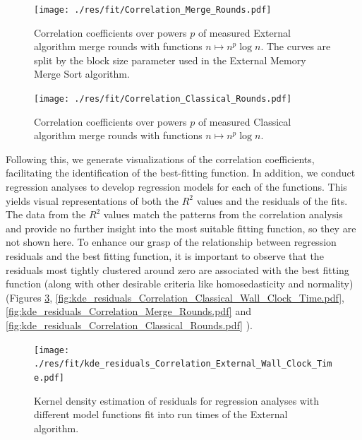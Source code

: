 \documentclass[twocolumn]{article}
\begin{document}
\begin{figure}[htb]
    \begin{minipage}{0.475 \textwidth}
        \centering
        \texttt{[image: ./res/fit/Correlation\_Merge\_Rounds.pdf]}
        \caption{Correlation coefficients over powers \( p \) of measured External algorithm merge rounds with functions \( n \mapsto n^p \log n\). The curves are split by the block size parameter used in the External Memory Merge Sort algorithm.}
        \label{fig:Correlation_Merge_Rounds.pdf}
    \end{minipage}
\end{figure}

\begin{figure}[htb]
    \begin{minipage}{0.475 \textwidth}
        \centering
        \texttt{[image: ./res/fit/Correlation\_Classical\_Rounds.pdf]}
        \caption{Correlation coefficients over powers \( p \) of measured Classical algorithm merge rounds with functions \( n \mapsto n^p \log n\).}
        \label{fig:Correlation_Classical_Rounds.pdf}
    \end{minipage}
\end{figure}

Following this, we generate visualizations of the correlation coefficients, facilitating the identification of the best-fitting function.
In addition, we conduct regression analyses to develop regression models for each of the functions.
This yields visual representations of both the \( R^2 \) values and the residuals of the fits. The data from the \( R^2 \) values match the patterns from the correlation analysis and provide no further insight into the most suitable fitting function, so they are not shown here.
To enhance our grasp of the relationship between regression residuals and the best fitting function, it is important to observe that the residuals most tightly clustered around zero are associated with the best fitting function (along with other desirable criteria like homosedasticity and normality)
(Figures \ref{fig:kde_residuals_Correlation_External_Wall_Clock_Time.pdf},
\ref{fig:kde_residuals_Correlation_Classical_Wall_Clock_Time.pdf},
\ref{fig:kde_residuals_Correlation_Merge_Rounds.pdf} and
\ref{fig:kde_residuals_Correlation_Classical_Rounds.pdf}
).

\begin{figure}[htb]
    \begin{minipage}{0.475 \textwidth}
        \centering
        \texttt{[image: ./res/fit/kde\_residuals\_Correlation\_External\_Wall\_Clock\_Time.pdf]}
        \caption{Kernel density estimation of residuals for regression analyses with different model functions fit into run times of the External algorithm.}
        \label{fig:kde_residuals_Correlation_External_Wall_Clock_Time.pdf}
    \end{minipage}
\end{figure}
\end{document}
